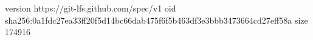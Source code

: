 version https://git-lfs.github.com/spec/v1
oid sha256:0a1fdc27ea33ff20f5d14bc66dab475f6f5b463df3e3bbb3473664cd27eff58a
size 174916
